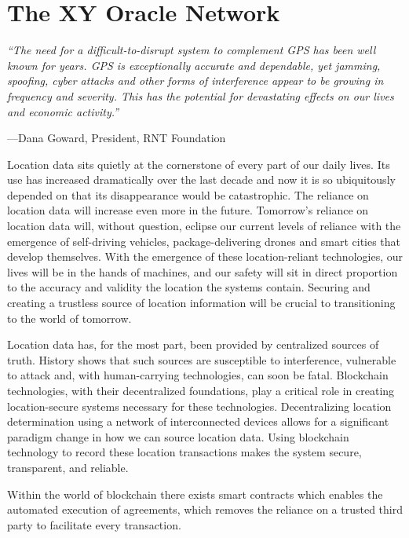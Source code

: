 \documentclass{article}
\begin{document}
\section {The XY Oracle Network}

\begin{displayquote}\textit{``The need for a difficult-to-disrupt system to complement GPS has been well known for years. GPS is exceptionally accurate and dependable, yet jamming, spoofing, cyber attacks and other forms of interference appear to be growing in frequency and severity. This has the potential for devastating effects on our lives and economic activity.''}

\vspace{2mm}
---Dana Goward, President, RNT Foundation
\end{displayquote}

Location data sits quietly at the cornerstone of every part of our daily lives. Its use has increased dramatically over the last decade and now it is so ubiquitously depended on that its disappearance would be catastrophic. The reliance on location data will increase even more in the future. Tomorrow's reliance on location data will, without question, eclipse our current levels of reliance with the emergence of self-driving vehicles, package-delivering drones and smart cities that develop themselves. With the emergence of these location-reliant technologies, our lives will be in the hands of machines, and our safety will sit in direct proportion to the accuracy and validity the location the systems contain. Securing and creating a trustless source of location information will be crucial to transitioning to the world of tomorrow.

Location data has, for the most part, been provided by centralized sources of truth. History shows that such sources are susceptible to interference, vulnerable to attack and, with human-carrying technologies, can soon be fatal. Blockchain technologies, with their decentralized foundations, play a critical role in creating location-secure systems necessary for these technologies. Decentralizing location determination using a network of interconnected devices allows for a significant paradigm change in how we can source location data. Using blockchain technology to record these location transactions makes the system secure, transparent, and reliable. 

Within the world of blockchain there exists smart contracts which enables the automated execution of agreements, which removes the reliance on a trusted third party to facilitate every transaction. 
\end{document}
